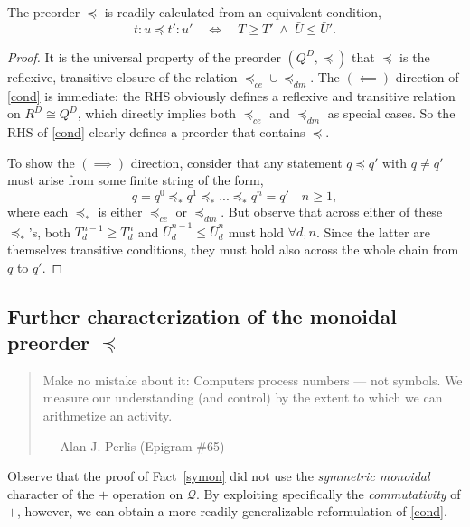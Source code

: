 \documentclass{article}
\newcommand{\Q}{\ensuremath{\mathcal{Q}}}
\begin{document}
\begin{fact}
  The preorder $\preceq$ is readily calculated from an equivalent condition,
  \begin{equation}
  t\!:\!u \preceq t'\!:\!u' \quad\iff\quad T \ge T' \;\wedge\; \bar{U} \le \bar{U}'.\label{cond}
  \end{equation}
\end{fact}
\begin{proof}
  It is the universal property of the preorder $(Q^D, \preceq)$ that $\preceq$ is the reflexive, transitive closure of the relation $\preceq_{ce} \cup \preceq_{dm}$.  The $(\!\impliedby\!)$ direction of \eqref{cond} is immediate: the RHS obviously defines a reflexive and transitive relation on $R^D \cong Q^D$, which directly implies both $\preceq_{ce}$ and $\preceq_{dm}$ as special cases.  So the RHS of \eqref{cond} clearly defines a preorder that contains $\preceq$.

  To show the $(\!\implies\!)$ direction, consider that any statement $q \preceq q'$ with $q \neq q'$ must arise from some finite string of the form,
  \begin{equation}
  q = q^0 \preceq_* q^1 \preceq_* ... \preceq_* q^n = q' \quad n \ge 1, \label{string}
  \end{equation}
  where each $\preceq_*$ is either $\preceq_{ce}$ or $\preceq_{dm}$.  But observe that across either of these $\preceq_*$'s, both $T_d^{n-1} \ge T_d^n$ and $\bar{U}_d^{n-1} \le \bar{U}_d^n$ must hold $\forall d, n$.  Since the latter are themselves transitive conditions, they must hold also across the whole chain from $q$ to $q'$.  
\end{proof}

\subsection{Further characterization of the monoidal preorder $\preceq$}

\begin{quote}
  Make no mistake about it: Computers process numbers --- not symbols.
  We measure our understanding (and control) by the extent to which
  we can arithmetize an activity.
  
  \hfill --- Alan J. Perlis (Epigram \#65)
\end{quote}

Observe that the proof of Fact~\ref{symon} did not use the {\em symmetric monoidal} character of the $+$ operation on $\Q$.  By exploiting specifically the {\em commutativity} of $+$, however, we can obtain a more readily generalizable reformulation of \eqref{cond}.
\end{document}
